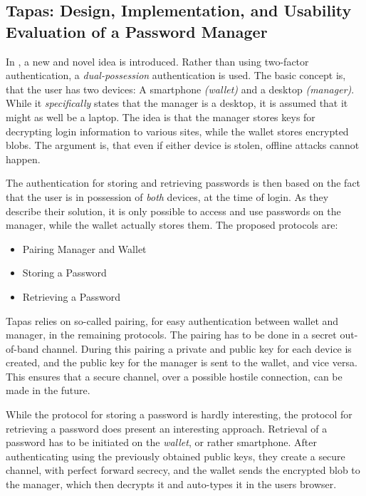 		\subsection*{Tapas: Design, Implementation, and Usability Evaluation of a Password Manager}
			In \cite{tapas}, a new and novel idea is introduced. Rather than using two-factor authentication, a \emph{dual-possession} authentication is used. The basic concept is, that the user has two devices: A smartphone \emph{(wallet)} and a desktop \emph{(manager)}. While it \emph{specifically} states that the manager is a desktop, it is assumed that it might as well be a laptop. The idea is that the manager stores keys for decrypting login information to various sites, while the wallet stores encrypted blobs. The argument is, that even if either device is stolen, offline attacks cannot happen.

			The authentication for storing and retrieving passwords is then based on the fact that the user is in possession of \emph{both} devices, at the time of login. As they describe their solution, it is only possible to access and use passwords on the manager, while the wallet actually stores them. The proposed protocols are:
			\begin{itemize}
				\item Pairing Manager and Wallet
				\item Storing a Password
				\item Retrieving a Password
			\end{itemize}

			Tapas relies on so-called pairing, for easy authentication between wallet and manager, in the remaining protocols. The pairing has to be done in a secret out-of-band channel. During this pairing a private and public key for each device is created, and the public key for the manager is sent to the wallet, and vice versa. This ensures that a secure channel, over a possible hostile connection, can be made in the future.

			While the protocol for storing a password is hardly interesting, the protocol for retrieving a password does present an interesting approach. Retrieval of a password has to be initiated on the \emph{wallet}, or rather smartphone. After authenticating using the previously obtained public keys, they create a secure channel, with perfect forward secrecy, and the wallet sends the encrypted blob to the manager, which then decrypts it and auto-types it in the users browser.

